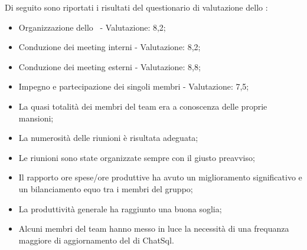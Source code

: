 \par Di seguito sono riportati i risultati del questionario di valutazione dello :
\begin{itemize}
  \item Organizzazione dello \ - Valutazione: 8,2;
  \item Conduzione dei meeting interni - Valutazione: 8,2;
  \item Conduzione dei meeting esterni - Valutazione: 8,8;
  \item Impegno e partecipazione dei singoli membri - Valutazione: 7,5;
  \item La quasi totalità dei membri del team era a conoscenza delle proprie mansioni;
  \item La numerosità delle riunioni è risultata adeguata;
  \item Le riunioni sono state organizzate sempre con il giusto preavviso;
  \item Il rapporto ore spese/ore produttive ha avuto un miglioramento significativo e un bilanciamento equo tra i membri del gruppo;
  \item La produttività generale ha raggiunto una buona soglia;
  \item Alcuni membri del team hanno messo in luce la necessità di una frequanza maggiore di aggiornamento del  di ChatSql.
\end{itemize}

